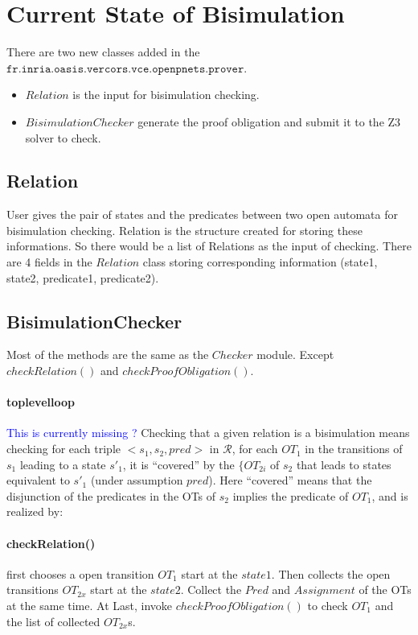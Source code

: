 \documentclass[a4paper]{lncs/llncs}
\newcommand{\ERIC}[1]{\textcolor{blue}{#1}}
\def\R{\mathcal{R}}
\begin{document}
\section{Current State of Bisimulation}
There are two new classes added in the $\texttt{fr.inria.oasis.vercors.vce.openpnets.prover}$.
\begin{itemize}
	\item $Relation$ is the input for bisimulation checking.
	\item $BisimulationChecker$ generate the proof obligation and submit it to the Z3 solver to check.
\end{itemize}

\subsection{Relation}
User gives the pair of states and the predicates between two open automata for bisimulation checking. Relation is the structure created for storing these informations. So there would be a list of Relations as the input of checking. There are 4 fields in the $Relation$ class storing corresponding information (state1, state2, predicate1, predicate2).

\subsection{BisimulationChecker}
Most of the methods are the same as the $Checker$ module. Except $checkRelation()$ and $checkProofObligation()$.

\paragraph{toplevelloop}
\ERIC{This is currently missing ?} Checking that a given relation is a
bisimulation means checking for each triple $<s_1,s_2,pred>$ in $\R$,
for each $OT_1$ in the transitions of $s_1$ leading to a state $s'_1$, it is
``covered'' by the $\{OT_{2i}$ of $s_2$ that leads to states equivalent to
$s'_1$ (under assumption $pred$). Here ``covered'' means that the
disjunction of the predicates in the OTs of $s_2$ implies the
predicate of $OT_1$, and is realized by:

\paragraph{checkRelation()} first chooses a open transition $OT_1$
start at the $state1$. Then collects the open transitions $OT_{2x}$
start at the $state2$. Collect the $Pred$ and $Assignment$ of the OTs
at the same time. At Last, invoke $checkProofObligation()$ to check 
$OT_1$ and the list of collected $OT_{2x}$s.
\end{document}
